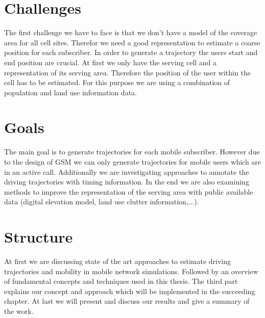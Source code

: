\documentclass[master,english]{hgbthesis}
\begin{document}
\section{Challenges}
The first challenge we have to face is that we don't have a model of the coverage area for all cell sites. Therefor we need a good representation to estimate a coarse position for each subscriber.
In order to generate a trajectory the users start and end position are crucial. At first we only have the serving cell and a representation of its serving area. Therefore the position of the user within the cell has to be estimated. For this purpose we are using a combination of population and land use information data.
\section{Goals}
The main goal is to generate trajectories for each mobile subscriber. However due to the design of GSM we can only generate trajectories for mobile users which are in an active call. Additionally we are investigating approaches to annotate the driving trajectories with timing information.
In the end we are also examining methods to improve the representation of the serving area with public available data (digital elevation model, land use clutter information,...).
\section{Structure}
At first we are discussing state of the art approaches to estimate driving trajectories and mobility in mobile network simulations. Followed by an overview of fundamental concepts and techniques used in this thesis. The third part explains our concept and approach which will be implemented in the succeeding chapter. At last we will present and discuss our results and give a summary of the work.%
\end{document}

